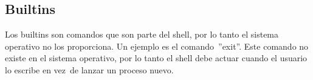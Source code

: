 \newpage
\subsection{Builtins}
Los builtins son comandos que son parte del shell, por lo tanto el sistema operativo no los proporciona. Un ejemplo es el comando\
''exit''. Este comando no existe en el sistema operativo, por lo tanto el shell debe actuar cuando el usuario lo escribe en vez\
de lanzar un proceso nuevo.
